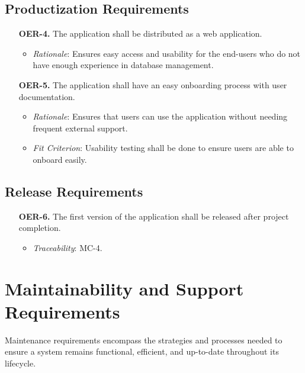 \documentclass[12pt]{article}
\begin{document}
\subsection{Productization Requirements}
\begin{enumerate}
  \item[\textbf{OER-4.}] The application shall be distributed as a web application.
    \begin{itemize}
      \item \textit{Rationale}: Ensures easy access and usability for the end-users who do not have enough experience in database management.
    \end{itemize}
  \item[\textbf{OER-5.}] The application shall have an easy onboarding process with user documentation.
    \begin{itemize}
      \item \textit{Rationale}: Ensures that users can use the application without needing frequent external support.
      \item \textit{Fit Criterion}: Usability testing shall be done to ensure users are able to onboard easily.
    \end{itemize}
\end{enumerate}

\subsection{Release Requirements}
\begin{enumerate}
  \item[\textbf{OER-6.}] The first version of the application shall be released after project completion.
    \begin{itemize}
      \item \textit{Traceability}: MC-4.
    \end{itemize}
\end{enumerate}

\section{Maintainability and Support Requirements}
Maintenance requirements encompass the strategies and processes needed to ensure
a system remains functional, efficient, and up-to-date throughout its lifecycle.
\end{document}
